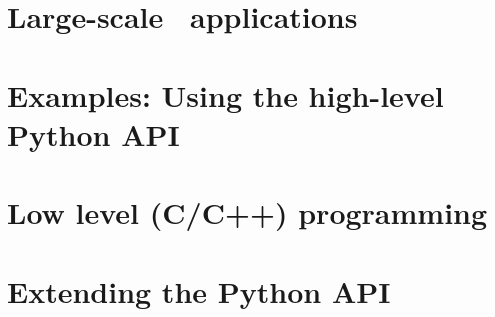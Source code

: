 \documentclass[10pt,a4paper,twoside]{book}
\begin{document}
 

 \thispagestyle{empty}
 \newpage
 \cleardoublepage 

 \pagestyle{plain}
 

 \cleardoublepage 
 
 \tableofcontents

 \newpage

 \cleardoublepage 

 \pagestyle{plain}
 
 
 



 \part{Large-scale \Peano\ applications}
 \newpage
 
 \newpage
 
 \newpage
 


 \part{Examples: Using the high-level Python API}
 \newpage
 
 \newpage
 
 \newpage
 
 \newpage
 

 
 
 \part{Low level (C/C++) programming}
 
 \newpage
 
 \newpage
 
 \newpage
 
 \newpage
 
 \newpage
 
 \newpage
 



%   
% 
% 
 \part{Extending the Python API}
 \newpage
 
 
\end{document}
